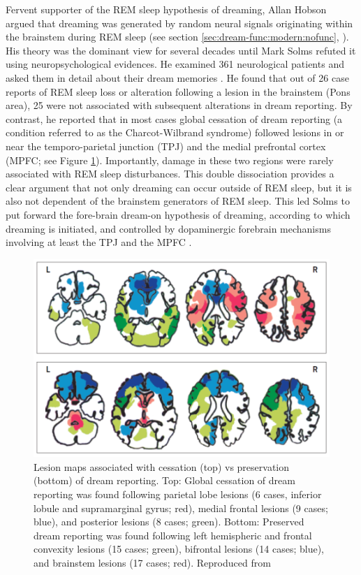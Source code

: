 Fervent supporter of the REM sleep hypothesis of dreaming, Allan Hobson argued that dreaming was generated by random neural signals originating within the brainstem during REM sleep (see section \ref{sec:dream-func:modern:nofunc}, \citealp{hobson_dream_1998}). His theory was the dominant view for several decades until Mark Solms refuted it using neuropsychological evidences. He examined 361 neurological patients and asked them in detail about their dream memories \citep{solms_neuropsychology_1997}. He found that out of 26 case reports of REM sleep loss or alteration following a lesion in the brainstem (Pons area), 25 were not associated with subsequent alterations in dream reporting. By contrast, he reported that in most cases global cessation of dream reporting (a condition referred to as the Charcot-Wilbrand syndrome) followed lesions in or near the temporo-parietal junction (TPJ) and the medial prefrontal cortex (MPFC; see Figure \ref{fig:intro:lesions}). Importantly, damage in these two regions were rarely associated with REM sleep disturbances. This double dissociation provides a clear argument that not only dreaming can occur outside of REM sleep, but it is also not dependent of the brainstem generators of REM sleep. This led Solms to put forward the fore-brain dream-on hypothesis of dreaming, according to which dreaming is initiated, and controlled by dopaminergic forebrain mechanisms involving at least the TPJ and the MPFC \citep{solms_dreaming_2000}.

\begin{figure}[htb]
	\includegraphics[width=\textwidth]{Fig/Intro/Intro_Lesions/Intro_Lesions.png}
	\caption[Lesion maps associated with cessation vs preservation of dream reporting]{Lesion maps associated with cessation (top) vs preservation (bottom) of dream reporting. Top: Global cessation of dream reporting was found following parietal lobe lesions (6 cases, inferior lobule and supramarginal gyrus; red), medial frontal lesions (9 cases; blue), and posterior lesions (8 cases; green). Bottom: Preserved dream reporting was found following left hemispheric and frontal convexity lesions (15 cases; green), bifrontal lesions (14 cases; blue), and brainstem lesions (17 cases; red). Reproduced from \citet{schwartz_dreaming:_2005}}
	\label{fig:intro:lesions}
\end{figure}

